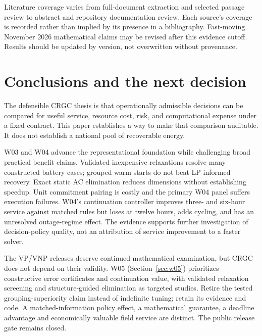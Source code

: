 \documentclass[11pt,letterpaper]{article}
\begin{document}
Literature coverage varies from full-document extraction and selected passage review to abstract and repository documentation review. Each source's coverage is recorded rather than implied by its presence in a bibliography. Fast-moving November 2026 mathematical claims may be revised after this evidence cutoff. Results should be updated by version, not overwritten without provenance.

\section{Conclusions and the next decision}
The defensible CRGC thesis is that operationally admissible decisions can be compared for useful service, resource cost, risk, and computational expense under a fixed contract. This paper establishes a way to make that comparison auditable. It does not establish a national pool of recoverable energy.

W03 and W04 advance the representational foundation while challenging broad practical benefit claims. Validated inexpensive relaxations resolve many constructed battery cases; grouped warm starts do not beat LP-informed recovery. Exact static AC elimination reduces dimensions without establishing speedup. Unit commitment pairing is costly and the primary W04 panel suffers execution failures. W04's continuation controller improves three- and six-hour service against matched rules but loses at twelve hours, adds cycling, and has an unresolved outage-regime effect. The evidence supports further investigation of decision-policy quality, not an attribution of service improvement to a faster solver.

The VP/VNP releases deserve continued mathematical examination, but CRGC does not depend on their validity. W05 (Section~\ref{sec:w05}) prioritizes constructive error certificates and continuation value, with validated relaxation screening and structure-guided elimination as targeted studies. Retire the tested grouping-superiority claim instead of indefinite tuning; retain its evidence and code. A matched-information policy effect, a mathematical guarantee, a deadline advantage and economically valuable field service are distinct. The public release gate remains closed.

\clearpage
\appendix
\end{document}
